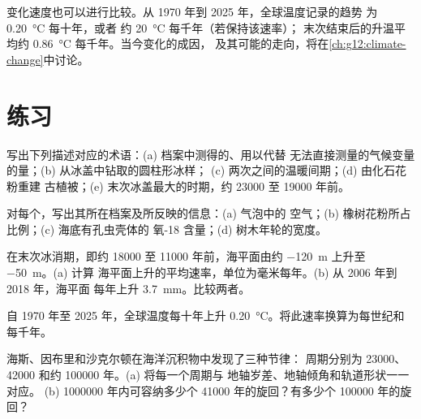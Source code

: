 变化速度也可以进行比较。从 1970 年到 2025 年，全球温度记录的趋势
为 \qty{0.20}{\degreeCelsius} 每十年，或者
约 \qty{20}{\degreeCelsius} 每千年（若保持该速率）；
末次结束后的升温平均约
\qty{0.86}{\degreeCelsius} 每千年。当今变化的成因，
及其可能的走向，将在\cref{ch:g12:climate-change}中讨论。

\section{练习}

\begin{exercise}[$\star$]\label{exo:g12:past-climates:1}
写出下列描述对应的术语：(a) 档案中测得的、用以代替
无法直接测量的气候变量的量；(b) 从冰盖中钻取的圆柱形冰样；
(c) 两次之间的温暖间期；(d) 由化石花粉重建
古植被；(e) 末次冰盖最大的时期，约 \num{23000} 至 \num{19000}
年前。
\end{exercise}

\begin{exercise}[$\star$]\label{exo:g12:past-climates:2}
对每个，写出其所在档案及所反映的信息：(a) 气泡中的
空气；(b) 橡树花粉所占比例；(c) 海底有孔虫壳体的
氧-18 含量；(d) 树木年轮的宽度。
\end{exercise}

\begin{exercise}[$\star$]\label{exo:g12:past-climates:3}
在末次冰消期，即约 \num{18000} 至 \num{11000}
年前，海平面由约 \qty{-120}{m} 上升至 \qty{-50}{m}。(a) 计算
海平面上升的平均速率，单位为毫米每年。(b) 从 2006 年到 2018 年，海平面
每年上升 \qty{3.7}{mm}。比较两者。
\end{exercise}

\begin{exercise}[$\star$]\label{exo:g12:past-climates:4}
自 1970 年至 2025 年，全球温度每十年上升
\qty{0.20}{\degreeCelsius}。将此速率换算为每世纪和每千年。
\end{exercise}

\begin{exercise}[$\star$]\label{exo:g12:past-climates:5}
海斯、因布里和沙克尔顿在海洋沉积物中发现了三种节律：
周期分别为 \num{23000}、\num{42000} 和约 \num{100000} 年。(a) 将每一个周期与
地轴岁差、地轴倾角和轨道形状一一对应。
(b) \num{1000000} 年内可容纳多少个 \num{41000} 年的旋回？有多少个
\num{100000} 年的旋回？
\end{exercise}

